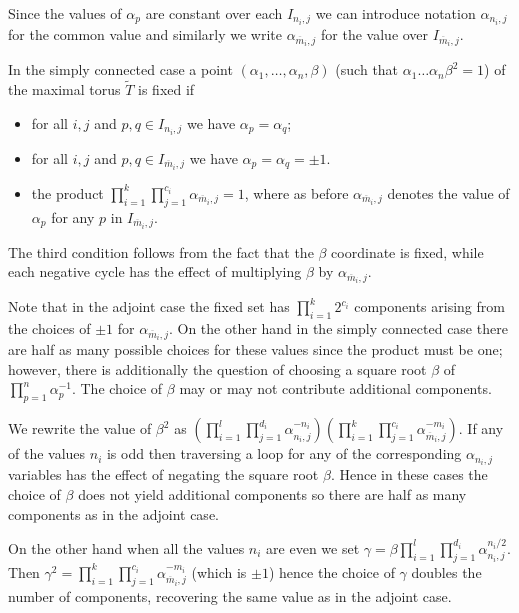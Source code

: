 \documentclass[11pt,a4paper]{article}
\def\mbar{\overline{m}}
\def\mbar{\overline{m}}
\def\coveringtorus{\tilde{T}}
\begin{document}
Since the values of $\alpha_p$ are constant over each $I_{n_i,j}$ we can introduce notation $\alpha_{n_i,j}$ for the common value and similarly we write $\alpha_{\mbar_i,j}$ for the value over $I_{\mbar_i,j}$.
\bigskip

In the simply connected case a point $(\alpha_1,\dots,\alpha_n,\beta)$ (such that $\alpha_1\dots\alpha_n\beta^2=1$) of the maximal torus $\coveringtorus$ is fixed if
\begin{itemize}
    \item for all $i,j$ and $p,q\in I_{n_i,j}$ we have $\alpha_p=\alpha_q$;
    \item for all $i,j$ and $p,q\in I_{\mbar_i,j}$ we have $\alpha_p=\alpha_q=\pm 1$.
    \item the product $\prod_{i=1}^k \prod_{j=1}^{c_i}\alpha_{\mbar_i,j}=1$, where as before $\alpha_{\mbar_i,j}$ denotes the value of $\alpha_p$ for any $p$ in $I_{\mbar_i,j}$.
\end{itemize}
The third condition follows from the fact that the $\beta$ coordinate is fixed, while each negative cycle has the effect of multiplying $\beta$ by $\alpha_{\mbar_i,j}$.

\bigskip

Note that in the adjoint case the fixed set has $\prod_{i=1}^k 2^{c_i}$ components arising from the choices of $\pm1$ for $\alpha_{\mbar_i,j}$. On the other hand in the simply connected case there are half as many possible choices for these values since the product must be one; however, there is additionally the question of choosing a square root $\beta$ of $\prod_{p=1}^n \alpha_p^{-1}$. The choice of $\beta$ may or may not contribute additional components.

We rewrite the value of $\beta^2$ as $(\prod_{i=1}^l\prod_{j=1}^{d_i}\alpha_{n_i,j}^{-n_i})(\prod_{i=1}^k\prod_{j=1}^{c_i}\alpha_{\mbar_i,j}^{-m_i})$.  If any of the values $n_i$ is odd then traversing a loop for any of the corresponding $\alpha_{n_i,j}$ variables has the effect of negating the square root $\beta$.  Hence in these cases the choice of $\beta$ does not yield additional components so there are half as many components as in the adjoint case.

On the other hand when all the values $n_i$ are even we set $\gamma=\beta\prod_{i=1}^l\prod_{j=1}^{d_i}\alpha_{n_i,j}^{n_i/2}$. 
Then $\gamma^2=\prod_{i=1}^k\prod_{j=1}^{c_i}\alpha_{\mbar_i,j}^{-m_i}$ (which is $\pm 1$) hence the choice of $\gamma$ doubles the number of components, recovering the same value as in the adjoint case.
\end{document}
